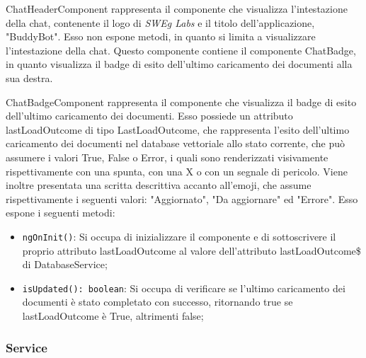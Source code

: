 \label{sec:chat_header_component}
ChatHeaderComponent rappresenta il componente che visualizza l'intestazione della chat, contenente il logo di \emph{SWEg Labs} e il titolo dell'applicazione, "BuddyBot". Esso non espone metodi, in quanto si limita a visualizzare l'intestazione della chat.
Questo componente contiene il componente ChatBadge, in quanto visualizza il badge di esito dell'ultimo caricamento dei documenti alla sua destra.

\label{sec:chat_badge_component}
ChatBadgeComponent rappresenta il componente che visualizza il badge di esito dell'ultimo caricamento dei documenti.
Esso possiede un attributo lastLoadOutcome di tipo LastLoadOutcome, che rappresenta l'esito dell'ultimo caricamento dei documenti nel database vettoriale allo stato corrente, che può assumere i valori True, False o Error, i quali sono renderizzati visivamente rispettivamente con una spunta, con una X o con un segnale di pericolo. Viene inoltre presentata una scritta descrittiva accanto all'emoji, che assume rispettivamente i seguenti valori: "Aggiornato", "Da aggiornare" ed "Errore".
Esso espone i seguenti metodi:
\begin{itemize}
    \item \texttt{ngOnInit()}: Si occupa di inizializzare il componente e di sottoscrivere il proprio attributo lastLoadOutcome al valore dell'attributo lastLoadOutcome\$ di DatabaseService;
    \item \texttt{isUpdated(): boolean}: Si occupa di verificare se l'ultimo caricamento dei documenti è stato completato con successo, ritornando true se lastLoadOutcome è True, altrimenti false;
\end{itemize}

\newpage


\subsubsection{Service}
\label{sec:service_frontend}

